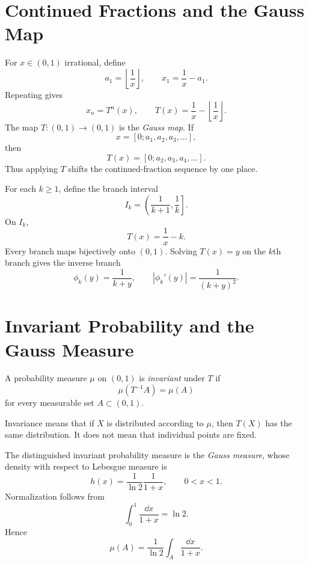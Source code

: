 \documentclass[a4paper]{article}
\begin{document}
\section{Continued Fractions and the Gauss Map}
For $x\in(0,1)$ irrational, define
\begin{equation}
 a_1=\left\lfloor\frac1x\right\rfloor,
 \qquad
 x_1=\frac1x-a_1.
\end{equation}
Repeating gives
\begin{equation}
 x_n=T^n(x),
 \qquad
 T(x)=\frac1x-\left\lfloor\frac1x\right\rfloor.
\end{equation}
The map $T:(0,1)\to(0,1)$ is the \emph{Gauss map}. If
\begin{equation}
 x=[0;a_1,a_2,a_3,\ldots],
\end{equation}
then
\begin{equation}
 T(x)=[0;a_2,a_3,a_4,\ldots].
\end{equation}
Thus applying $T$ shifts the continued-fraction sequence by one place.

For each $k\ge1$, define the branch interval
\begin{equation}
 I_k=\left(\frac1{k+1},\frac1k\right].
\end{equation}
On $I_k$,
\begin{equation}
 T(x)=\frac1x-k.
\end{equation}
Every branch maps bijectively onto $(0,1)$. Solving $T(x)=y$ on the $k$th branch gives the inverse branch
\begin{equation}
 \phi_k(y)=\frac1{k+y},
 \qquad
 \left|\phi_k'(y)\right|=\frac1{(k+y)^2}.
\end{equation}

\section{Invariant Probability and the Gauss Measure}
\begin{definition}
A probability measure $\mu$ on $(0,1)$ is \emph{invariant} under $T$ if
\begin{equation}
 \mu(T^{-1}A)=\mu(A)
\end{equation}
for every measurable set $A\subset(0,1)$.
\end{definition}
Invariance means that if $X$ is distributed according to $\mu$, then $T(X)$ has the same distribution. It does not mean that individual points are fixed.

The distinguished invariant probability measure is the \emph{Gauss measure}, whose density with respect to Lebesgue measure is
\begin{equation}
 h(x)=\frac{1}{\ln2}\frac1{1+x},
 \qquad 0<x<1.
\end{equation}
Normalization follows from
\begin{equation}
 \int_0^1\frac{\dd x}{1+x}=\ln2.
\end{equation}
Hence
\begin{equation}
 \mu(A)=\frac1{\ln2}\int_A\frac{\dd x}{1+x}.
\end{equation}
\end{document}

